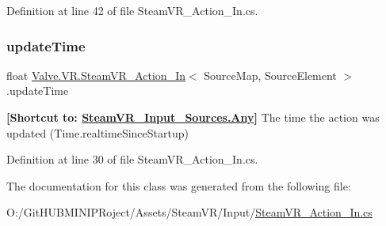 Definition at line 42 of file Steam\+V\+R\+\_\+\+Action\+\_\+\+In.\+cs.

\mbox{\label{class_valve_1_1_v_r_1_1_steam_v_r___action___in_a2b6e25e75c6ebc79eda8b335abedb031}} 
\subsubsection{\texorpdfstring{updateTime}{updateTime}}
{\footnotesize\ttfamily float \mbox{\hyperlink{class_valve_1_1_v_r_1_1_steam_v_r___action___in}{Valve.\+V\+R.\+Steam\+V\+R\+\_\+\+Action\+\_\+\+In}}$<$ Source\+Map, Source\+Element $>$.update\+Time\hspace{0.3cm}{\ttfamily [get]}}



{\bfseries{\mbox{[}Shortcut to\+: \mbox{\hyperlink{namespace_valve_1_1_v_r_a82e5bf501cc3aa155444ee3f0662853faed36a1ef76a59ee3f15180e0441188ad}{Steam\+V\+R\+\_\+\+Input\+\_\+\+Sources.\+Any}}\mbox{]}}} The time the action was updated (Time.\+realtime\+Since\+Startup) 



Definition at line 30 of file Steam\+V\+R\+\_\+\+Action\+\_\+\+In.\+cs.



The documentation for this class was generated from the following file\+:\begin{DoxyCompactItemize}
\item 
O\+:/\+Git\+H\+U\+B\+M\+I\+N\+I\+P\+Roject/\+Assets/\+Steam\+V\+R/\+Input/\mbox{\hyperlink{_steam_v_r___action___in_8cs}{Steam\+V\+R\+\_\+\+Action\+\_\+\+In.\+cs}}\end{DoxyCompactItemize}
